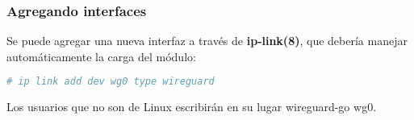 \begin{frame}[fragile]
  \frametitle{Agregando interfaces}

  Se puede agregar una nueva interfaz a través de \textbf{ip-link(8)},
  que debería manejar automáticamente la carga del módulo:

  \vspace{\baselineskip}
  \begin{lstlisting}[language=Bash]
  # ip link add dev wg0 type wireguard
  \end{lstlisting}

  Los usuarios que no son de Linux escribirán en su lugar wireguard-go wg0.

\end{frame}


%
%
